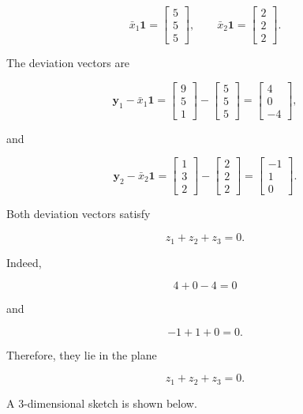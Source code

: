 \documentclass{article}
\begin{document}
\[
\bar{x}_1\mathbf{1}
=
\begin{bmatrix}
5\\5\\5
\end{bmatrix},
\qquad
\bar{x}_2\mathbf{1}
=
\begin{bmatrix}
2\\2\\2
\end{bmatrix}.
\]

The deviation vectors are

\[
\mathbf y_1-\bar{x}_1\mathbf{1}
=
\begin{bmatrix}
9\\5\\1
\end{bmatrix}
-
\begin{bmatrix}
5\\5\\5
\end{bmatrix}
=
\boxed{
\begin{bmatrix}
4\\0\\-4
\end{bmatrix}},
\]

and

\[
\mathbf y_2-\bar{x}_2\mathbf{1}
=
\begin{bmatrix}
1\\3\\2
\end{bmatrix}
-
\begin{bmatrix}
2\\2\\2
\end{bmatrix}
=
\boxed{
\begin{bmatrix}
-1\\1\\0
\end{bmatrix}}.
\]

Both deviation vectors satisfy

\[
z_1+z_2+z_3=0.
\]

Indeed,

\[
4+0-4=0
\]

and

\[
-1+1+0=0.
\]

Therefore, they lie in the plane

\[
z_1+z_2+z_3=0.
\]

A 3-dimensional sketch is shown below.
\end{document}
